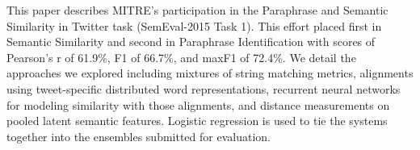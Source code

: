 This paper describes MITRE's participation in the Paraphrase and Semantic Similarity in Twitter task (SemEval-2015 Task 1). This effort placed first in Semantic Similarity and second in Paraphrase Identification with scores of Pearson's r of 61.9\%, F1 of 66.7\%, and maxF1 of 72.4\%. We detail the approaches we explored including mixtures of string matching metrics, alignments using tweet-specific distributed word representations, recurrent neural networks for modeling similarity with those alignments, and distance measurements on pooled latent semantic features. Logistic regression is used to tie the systems together into the ensembles submitted for evaluation.
